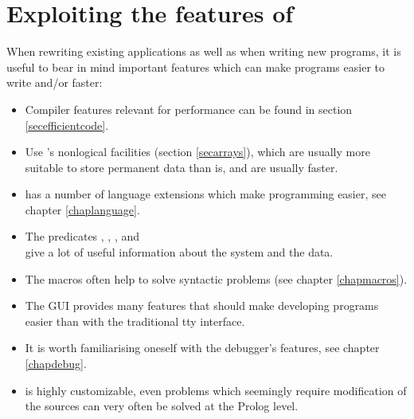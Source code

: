 \section{Exploiting the features of {\eclipse}}
When rewriting existing applications as well as when writing new programs,
it is useful to bear in mind important {\eclipse} features which can make
programs easier to write and/or faster:
\begin{itemize}
\item Compiler features relevant for performance can be found in section
\ref{secefficientcode}.

\item Use {\eclipse}'s nonlogical
 facilities
(section \ref{secarrays}),
which are usually more suitable to store permanent data than
 is, and are usually
faster.

\item {\eclipse} has a number of language extensions which make programming
easier, see chapter \ref{chaplanguage}.

\item The predicates , ,
,  and\\
give a lot of useful information about the system and the data.

\item The {\eclipse} macros often help to solve syntactic problems
(see chapter \ref{chapmacros}).

\item The {\tkeclipse} GUI provides many features that should make
developing programs easier than with the traditional tty interface.

\item It is worth familiarising oneself with the debugger's features,
see chapter \ref{chapdebug}.

\item {\eclipse} is highly customizable, even problems which seemingly
require modification of the {\eclipse} sources
can very often be solved at the Prolog level.
\end{itemize}

